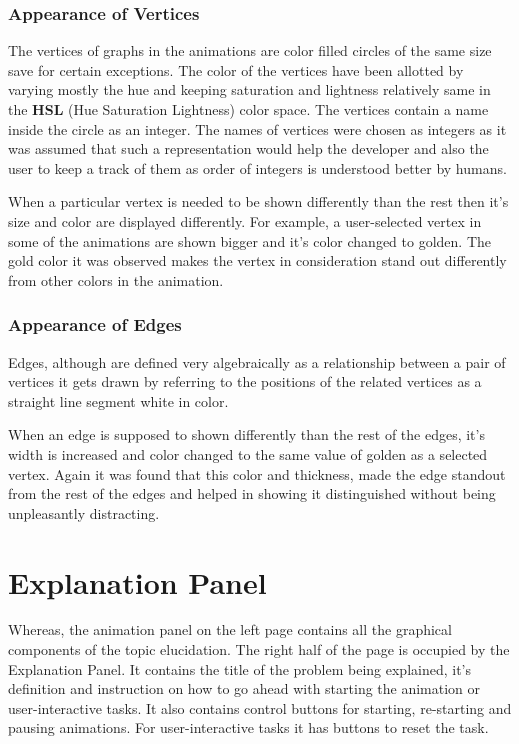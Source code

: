 \subsubsection{Appearance of Vertices} 

The vertices of graphs in the animations are color filled circles of the
same size save for certain exceptions. The color of the vertices have been
allotted by varying mostly the hue and keeping saturation and lightness
relatively same in the \textbf{HSL} (Hue Saturation Lightness) color space. The
vertices contain a name inside the circle as an integer. The names of vertices
were chosen as integers as it was assumed that such a representation would help
the developer and also the user to keep a track of them as order of integers
is understood better by humans.

When a particular vertex is needed to be shown differently than the rest then
it's size and color are displayed differently. For example, a user-selected
vertex in some of the animations are shown bigger and it's color changed to
golden. The gold color it was observed makes the vertex in consideration
stand out differently from other colors in the animation.

\subsubsection{Appearance of Edges}
Edges, although are defined very algebraically as a relationship between a pair
of vertices it gets drawn by referring to the positions of the related vertices
as a straight line segment white in color.

When an edge is supposed to shown differently than the rest of the edges, it's
width is increased and color changed to the same value of golden as a selected vertex.
Again it was found that this color and thickness, made the edge standout from the
rest of the edges and helped in showing it distinguished without being unpleasantly
distracting.

\section{Explanation Panel}
Whereas, the animation panel on the left page contains all the graphical
components of the topic elucidation.  The right half of the page is occupied by
the Explanation Panel. It contains the title of the problem being explained,
it's definition and instruction on how to go ahead with starting the animation
or user-interactive tasks.  It also contains control buttons for starting,
re-starting and pausing animations.  For user-interactive tasks it has buttons
to reset the task.

